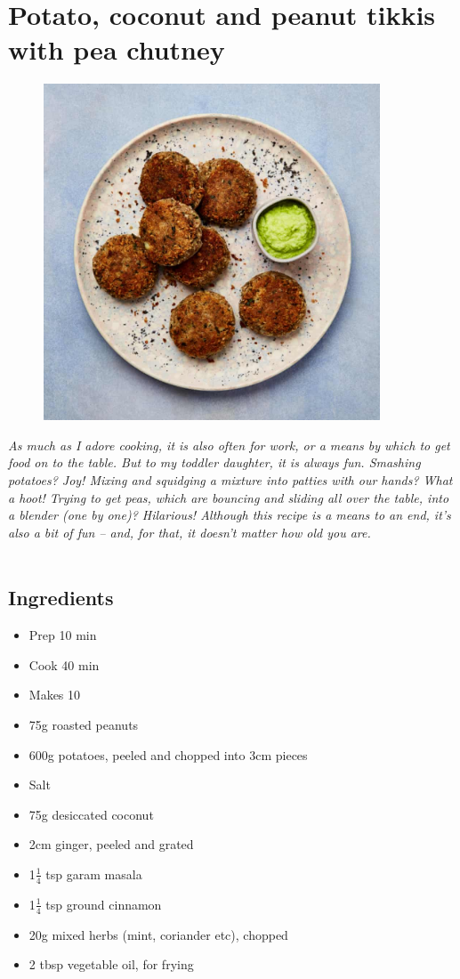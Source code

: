 \documentclass{book}
\begin{document}
\section{Potato, coconut and peanut tikkis with pea chutney}
\begin{figure}
\centering\includegraphics[width=10cm,height=10cm,keepaspectratio]{Recipe_Pictures/Potato,_coconut_and_peanut_tikkis_with_pea_chutney.png}
\end{figure}
\emph{As much as I adore cooking, it is also often for work, or a means by which to get food on to the table. But to my toddler daughter, it is always fun. Smashing potatoes? Joy! Mixing and squidging a mixture into patties with our hands? What a hoot! Trying to get peas, which are bouncing and sliding all over the table, into a blender (one by one)? Hilarious! Although this recipe is a means to an end, it’s also a bit of fun – and, for that, it doesn’t matter how old you are.}\\\\ 
\subsection*{Ingredients}
\begin{itemize}
\item Prep 10 min
\item Cook 40 min
\item Makes 10
\end{itemize}

\begin{itemize}
\item 75g roasted peanuts 
\item 600g potatoes, peeled and chopped into 3cm pieces
\item Salt
\item 75g desiccated coconut
\item 2cm ginger, peeled and grated 
\item 1$\frac{1}{4}$ tsp garam masala
\item 1$\frac{1}{4}$ tsp ground cinnamon
\item 20g mixed herbs (mint, coriander etc), chopped
\item 2 tbsp vegetable oil, for frying
\end{itemize}
\end{document}
